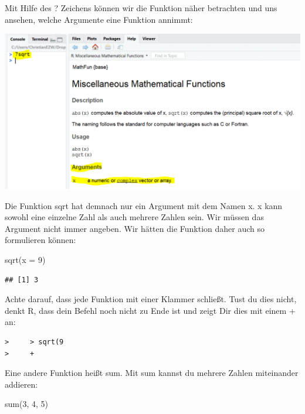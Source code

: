 \documentclass[
]{book}
\newenvironment{Shaded}{\begin{snugshade}}{\end{snugshade}}
\newcommand{\AttributeTok}[1]{\textcolor[rgb]{0.77,0.63,0.00}{#1}}
\newcommand{\DecValTok}[1]{\textcolor[rgb]{0.00,0.00,0.81}{#1}}
\newcommand{\FunctionTok}[1]{\textcolor[rgb]{0.00,0.00,0.00}{#1}}
\newcommand{\NormalTok}[1]{#1}
\begin{document}
Mit Hilfe des ? Zeichens können wir die Funktion näher betrachten und uns ansehen, welche Argumente eine Funktion annimmt:

\includegraphics{images/02_grundlagen/funktion.png}

Die Funktion sqrt hat demnach nur ein Argument mit dem Namen x. x kann sowohl eine einzelne Zahl als auch mehrere Zahlen sein. Wir müssen das Argument nicht immer angeben. Wir hätten die Funktion daher auch so formulieren können:

\begin{Shaded}
\begin{Highlighting}[]
\FunctionTok{sqrt}\NormalTok{(}\AttributeTok{x =} \DecValTok{9}\NormalTok{)}
\end{Highlighting}
\end{Shaded}

\begin{verbatim}
## [1] 3
\end{verbatim}

Achte darauf, dass jede Funktion mit einer Klammer schließt. Tust du dies nicht, denkt R, dass dein Befehl noch nicht zu Ende ist und zeigt Dir dies mit einem + an:

\begin{verbatim}
>     > sqrt(9
>     +
\end{verbatim}

Eine andere Funktion heißt sum. Mit sum kannst du mehrere Zahlen miteinander addieren:

\begin{Shaded}
\begin{Highlighting}[]
\FunctionTok{sum}\NormalTok{(}\DecValTok{3}\NormalTok{, }\DecValTok{4}\NormalTok{, }\DecValTok{5}\NormalTok{)}
\end{Highlighting}
\end{Shaded}
\end{document}
